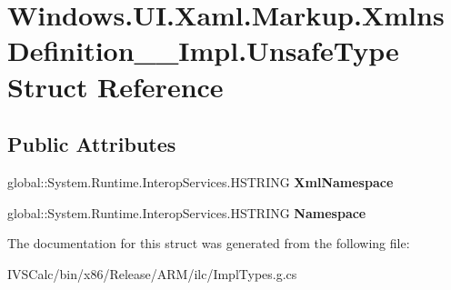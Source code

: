 \hypertarget{struct_windows_1_1_u_i_1_1_xaml_1_1_markup_1_1_xmlns_definition_____impl_1_1_unsafe_type}{}\section{Windows.\+U\+I.\+Xaml.\+Markup.\+Xmlns\+Definition\+\_\+\+\_\+\+Impl.\+Unsafe\+Type Struct Reference}
\label{struct_windows_1_1_u_i_1_1_xaml_1_1_markup_1_1_xmlns_definition_____impl_1_1_unsafe_type}
\subsection*{Public Attributes}
\begin{DoxyCompactItemize}
\item 
\mbox{\label{struct_windows_1_1_u_i_1_1_xaml_1_1_markup_1_1_xmlns_definition_____impl_1_1_unsafe_type_a2112093b06ebaab379a439445363a974}} 
global\+::\+System.\+Runtime.\+Interop\+Services.\+H\+S\+T\+R\+I\+NG {\bfseries Xml\+Namespace}
\item 
\mbox{\label{struct_windows_1_1_u_i_1_1_xaml_1_1_markup_1_1_xmlns_definition_____impl_1_1_unsafe_type_a8b5986e8443d06449976009ff42da1d0}} 
global\+::\+System.\+Runtime.\+Interop\+Services.\+H\+S\+T\+R\+I\+NG {\bfseries Namespace}
\end{DoxyCompactItemize}


The documentation for this struct was generated from the following file\+:\begin{DoxyCompactItemize}
\item 
I\+V\+S\+Calc/bin/x86/\+Release/\+A\+R\+M/ilc/Impl\+Types.\+g.\+cs\end{DoxyCompactItemize}
